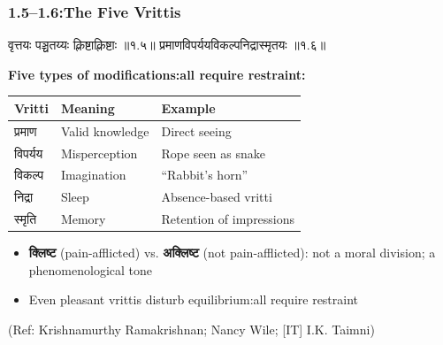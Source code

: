 \begin{frame}[fragile]\frametitle{1.5–1.6:The Five Vrittis}

\begin{sanskrit}
वृत्तयः पञ्चतय्यः क्लिष्टाक्लिष्टाः ॥१.५॥
प्रमाणविपर्ययविकल्पनिद्रास्मृतयः ॥१.६॥
\end{sanskrit}

\textbf{Five types of modifications:all require restraint:}

\begin{center}
{\small
\begin{tabular}{|p{2cm}|p{2.5cm}|p{2.5cm}|}
\hline
\textbf{Vritti} & \textbf{Meaning} & \textbf{Example} \\
\hline
प्रमाण & Valid knowledge & Direct seeing \\
विपर्यय & Misperception & Rope seen as snake \\
विकल्प & Imagination & ``Rabbit's horn'' \\
निद्रा & Sleep & Absence-based vritti \\
स्मृति & Memory & Retention of impressions \\
\hline
\end{tabular}
}
\end{center}

\begin{itemize}
\item \textbf{क्लिष्ट} (pain-afflicted) vs. \textbf{अक्लिष्ट} (not pain-afflicted): not a moral division; a phenomenological tone
\item Even pleasant vrittis disturb equilibrium:all require restraint
\end{itemize}

\tiny{(Ref: Krishnamurthy Ramakrishnan; Nancy Wile; [IT] I.K. Taimni)}

\end{frame}

